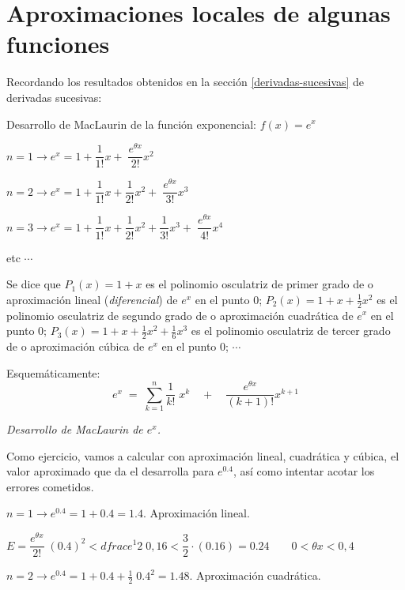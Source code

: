 	
	\section{Aproximaciones locales de algunas funciones}
	
	Recordando los resultados obtenidos en la sección \ref{derivadas-sucesivas} de derivadas sucesivas:
	
	\begin{ejem} Desarrollo de MacLaurin de la función exponencial: $f(x)=e^x$
	
	$n=1 \to e^x=1+	\dfrac {1}{1!}x+ \boxed{\; \dfrac {e^{\theta x}}{2!}x^2}\; $
	
	$n=2 \to e^x=1+	\dfrac {1}{1!}x+ \dfrac {1}{2!}x^2+ \boxed{\; \dfrac {e^{\theta x}}{3!}x^3}\; $
	
	$n=3 \to e^x=1+	\dfrac {1}{1!}x+ \dfrac {1}{2!}x^2+ \dfrac {1}{3!}x^3+\boxed{\; \dfrac {e^{\theta x}}{4!}x^4}\; $
	
	etc $\cdots$
	
	Se dice que $P_1(x)=1+x$ es el polinomio osculatriz de primer grado de o aproximación lineal (\textit{diferencial}) de $e^x$ en el punto $0$; $P_2(x)=1+x+\frac 1 2 x^2$ es el polinomio osculatriz de segundo grado de o aproximación cuadrática  de $e^x$ en el punto $0$; $P_3(x)=1+x+\frac 1 2 x^2+ \frac 1 6 x^3$ es el polinomio osculatriz de tercer grado de o aproximación cúbica  de $e^x$ en el punto $0$;	$\cdots$
	
	Esquemáticamente:  
	\begin{equation}\label{MacLaurin-exp}
		\boxed{\quad { e }^{ x }\; =\; \sum _{ k=1 }^{ n }{ \dfrac { 1 }{ k! } \; { x }^{ k } } 	\quad +\quad \dfrac { { e }^{ \theta x } }{ (k+1)! } { x }^{ k+1 } \quad}  
	\end{equation}
	\centerline{\emph{Desarrollo de MacLaurin de $e^x$.}}
	
	Como ejercicio, vamos a calcular con aproximación lineal, cuadrática y cúbica, el valor aproximado que da el desarrolla para $e^{0.4}$, así como intentar acotar los errores cometidos.
	
	\vspace{2mm}
	
	$n=1 \to e^{0.4}=1+0.4=1.4 $. Aproximación lineal.
	
	$E=\dfrac {e^{\theta x}}{2!}\; (0.4)^2 < dfrac {e^1}{2}\; 0,16 < \dfrac {3}{2} \cdot (0.16)=0.24 \qquad 0<\theta x< 0,4$
	
	\vspace{2mm}
	
	$n=2 \to e^{0.4}=1+0.4+\frac 1 2\;  0.4^2=1.48 $. Aproximación cuadrática.
	

\end{ejem}
